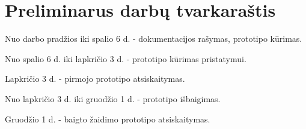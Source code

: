 \section{Preliminarus darbų tvarkaraštis}

Nuo darbo pradžios iki spalio 6 d. - dokumentacijos rašymas, prototipo kūrimas.

Nuo spalio 6 d. iki lapkričio 3 d. - prototipo kūrimas pristatymui.

Lapkričio 3 d. - pirmojo prototipo atsiskaitymas.

Nuo lapkričio 3 d. iki gruodžio 1 d. - prototipo išbaigimas.

Gruodžio 1 d. - baigto žaidimo prototipo atsiskaitymas.
